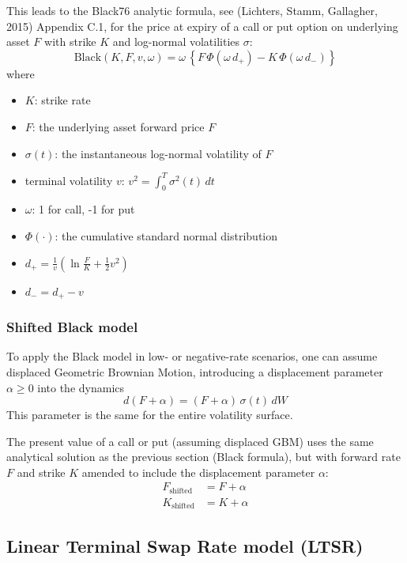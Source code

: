 This leads to the Black76 analytic formula, see (Lichters, Stamm, Gallagher, 2015)
Appendix C.1, for the price at expiry of a call or put option on underlying asset $F$
with strike $K$ and log-normal volatilities $\sigma$:
$$
\mbox{Black}(K,F ,v,\omega)=\omega\,\left\{F\,\Phi(\omega\, d_+) - K\,\Phi(\omega \, d_-)\right\}
$$
where
\begin{itemize}
\item $K$: strike rate
\item $F$: the underlying asset forward price $F$
\item $\sigma(t)$: the instantaneous log-normal volatility of $F$
\item  terminal volatility $v$: $\displaystyle v^2=\int_0^T\sigma^2(t)\,dt$
\item $\omega$: 1 for call, -1 for put
\item $\Phi(\cdot)$: the cumulative standard normal distribution
\item $\displaystyle d_+ = \frac{1}{v}\left(\ln\frac{F}{K}+ \frac{1}{2}v^2\right)$
\item $d_-= d_+ - v$
\end{itemize}

\subsubsection*{Shifted Black model}

To apply the Black model in low- or negative-rate scenarios, one can assume displaced
Geometric Brownian Motion, introducing a displacement parameter $\alpha\geq 0$ into
the dynamics
$$
d(F + \alpha) = (F + \alpha)\,\sigma(t)\,dW
$$
This parameter is the same for the entire volatility surface.

The present value of a call or put (assuming displaced GBM) uses
the same analytical solution as the previous section (Black formula), but with
forward rate $F$ and strike $K$ amended to include the displacement parameter
$\alpha$:
\begin{align*}
F_{\mbox{shifted}} &= F + \alpha \\
K_{\mbox{shifted}} &= K + \alpha
\end{align*}

\subsection{Linear Terminal Swap Rate model (LTSR)}
\label{models:LTSR}

